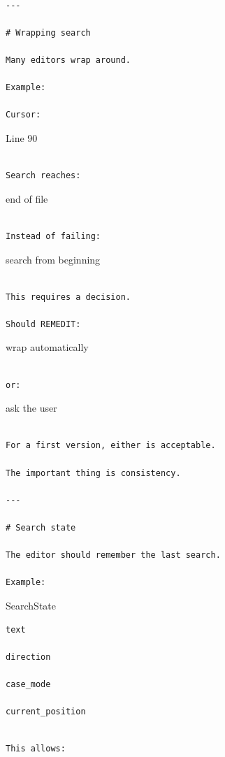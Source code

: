 \documentclass[
  oneside,
  openany]{book}
\begin{document}
\begin{verbatim}

---

# Wrapping search

Many editors wrap around.

Example:

Cursor:
\end{verbatim}

Line 90

\begin{verbatim}

Search reaches:
\end{verbatim}

end of file

\begin{verbatim}

Instead of failing:
\end{verbatim}

search from beginning

\begin{verbatim}

This requires a decision.

Should REMEDIT:
\end{verbatim}

wrap automatically

\begin{verbatim}

or:
\end{verbatim}

ask the user

\begin{verbatim}

For a first version, either is acceptable.

The important thing is consistency.

---

# Search state

The editor should remember the last search.

Example:
\end{verbatim}

SearchState

\begin{verbatim}
text

direction

case_mode

current_position
\end{verbatim}

\begin{verbatim}

This allows:
\end{verbatim}
\end{document}
